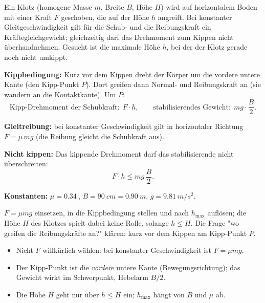 
Ein Klotz (homogene Masse $m$, Breite $B$, Höhe $H$) wird auf horizontalem
Boden mit einer Kraft $F$ geschoben, die auf der Höhe $h$ angreift. Bei
konstanter Gleitgeschwindigkeit gilt für die Schub- und die Reibungskraft
ein Kräftegleichgewicht; gleichzeitig darf das Drehmoment zum Kippen nicht
überhandnehmen. Gesucht ist die maximale Höhe $h$, bei der der Klotz gerade
noch nicht umkippt.

\begin{werkzeugkasten}[Werkzeuge]
\textbf{Kippbedingung:} Kurz vor dem Kippen dreht der Körper um die vordere
untere Kante (den Kipp-Punkt $P$). Dort greifen dann Normal- und
Reibungskraft an (sie wandern an die Kontaktkante). Um $P$:
\begin{equation}
  \text{Kipp-Drehmoment der Schubkraft}:\; F\cdot h,
  \qquad
  \text{stabilisierendes Gewicht}:\; m g\cdot \frac B2.
\end{equation}

\textbf{Gleitreibung:} bei konstanter Geschwindigkeit gilt in horizontaler
Richtung $F = \mu\, mg$ (die Reibung gleicht die Schubkraft aus).

\textbf{Nicht kippen:} Das kippende Drehmoment darf das stabilisierende nicht
überschreiten:
\begin{equation}
  F\cdot h \le m g\,\frac B2.
\end{equation}

\textbf{Konstanten:} $\mu=\qty{0.34}{}$, $B=\qty{90}{cm}=\qty{0.90}{m}$,
$g=\qty{9.81}{m/s^2}$.
\end{werkzeugkasten}

\begin{werkzeugkasten}
$F=\mu mg$ einsetzen, in die Kippbedingung stellen und nach $h_\mathrm{max}$
auflösen; die Höhe $H$ des Klotzes spielt dabei keine Rolle, solange
$h\le H$. Die Frage "wo greifen die Reibungskräfte an?" klären: kurz vor
dem Kippen am Kipp-Punkt $P$.
\end{werkzeugkasten}

\begin{achtung}
\begin{itemize}
  \item Nicht $F$ willkürlich wählen: bei konstanter Geschwindigkeit ist
       $F=\mu mg$.
  \item Der Kipp-Punkt ist die \emph{vordere} untere Kante (Bewegungsrichtung);
       das Gewicht wirkt im Schwerpunkt, Hebelarm $B/2$.
  \item Die Höhe $H$ geht nur über $h\le H$ ein; $h_\mathrm{max}$ hängt von
       $B$ und $\mu$ ab.
\end{itemize}
\end{achtung}